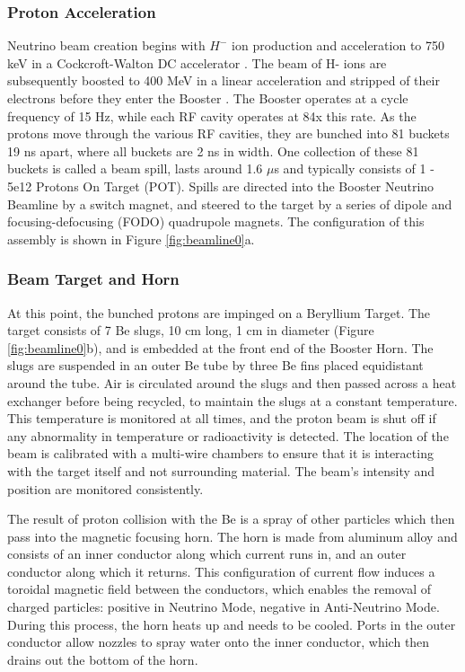 \documentclass[12pt]{article}
\begin{document}
\subsubsection{Proton Acceleration}
Neutrino beam creation begins with $H^-$ ion production and acceleration to 750 keV in a Cockcroft-Walton DC accelerator \cite{anderson}. The beam of H- ions are subsequently boosted to 400 MeV in a linear acceleration and stripped of their electrons before they enter the Booster \cite{bib:bnbflux}.  The Booster operates at a cycle frequency of 15 Hz, while each RF cavity operates at 84x this rate. As the protons move through the various RF cavities, they are bunched into 81 buckets 19 ns apart, where all buckets are 2 ns in width.  One collection of these 81 buckets is called a beam spill, lasts around 1.6 $\mu$s and typically consists of 1 - 5e12 Protons On Target (POT). Spills are directed into the Booster Neutrino Beamline by a switch magnet, and steered to the target by a series of dipole and focusing-defocusing (FODO) quadrupole magnets.  The configuration of this assembly is shown in Figure \ref{fig:beamline0}a. 
\subsubsection{Beam Target and Horn}
\par At this point, the bunched protons are impinged on a Beryllium Target. The target consists of 7 Be slugs, 10 cm long, 1 cm in diameter (Figure \ref{fig:beamline0}b), and is embedded at the front end of the Booster Horn. The slugs are suspended in an outer Be tube by three Be fins placed equidistant around the tube.  Air is circulated around the slugs and then passed across a heat exchanger before being recycled, to maintain the slugs at a constant temperature. This temperature is monitored at all times, and the proton beam is shut off if any abnormality in temperature or radioactivity is detected. The location of the beam is calibrated with a multi-wire chambers to ensure that it is interacting with the target itself and not surrounding material. The beam's intensity and position are monitored consistently.
\par The result of proton collision with the Be is a spray of other particles which then pass into the magnetic focusing horn. The horn is made from aluminum alloy and consists of an inner conductor along which current runs in, and an outer conductor along which it returns. This configuration of current flow induces a toroidal magnetic field between the conductors, which enables the removal of charged particles: positive in Neutrino Mode, negative in Anti-Neutrino Mode. During this process, the horn heats up and needs to be cooled.  Ports in the outer conductor allow nozzles to spray water onto the inner conductor, which then drains out the bottom of the horn.
\end{document}

